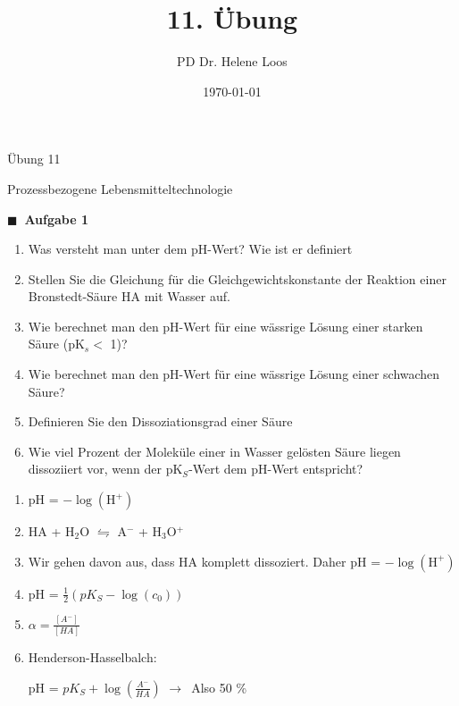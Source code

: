\documentclass[aspectratio=169,9pt]{beamer}
\title{11. Übung}
\author{PD Dr. Helene Loos}
\date{\today}
\newcommand{\RA}{$\rightarrow$~}
\newcommand{\pp}{\par \vspace*{2mm}}
\newcommand{\antwort}[1]{
\begin{tcolorbox}[
	enhanced,
	colframe=unigrau!65,
	sharp corners,
	boxsep=1pt,
	colback=white,
	coltitle=black,
]
	#1
	\end{tcolorbox}
}
\begin{document}
\small



\begin{frame}
\begin{center}

\LARGE Übung 11  \par \normalsize
Prozessbezogene Lebensmitteltechnologie
\end{center}
\small
\end{frame}



\begin{frame}


\begin{minipage}{.5\textwidth}
{\color{miugray}$\blacksquare ~$} \textbf{Aufgabe  1} \par \vspace*{2mm}

\begin{enumerate}[label=\alph*)]
\item<1-> Was versteht man unter dem pH-Wert? Wie ist er definiert
\item<3-> Stellen Sie die Gleichung für die Gleichgewichtskonstante der Reaktion einer Bronstedt-Säure HA mit Wasser auf.
\item<5-> Wie berechnet man den pH-Wert für eine wässrige Lösung einer starken Säure (pK$_s <$ 1)?
\item<7-> Wie berechnet man den pH-Wert für eine wässrige Lösung einer schwachen Säure?
\item<9-> Definieren Sie den Dissoziationsgrad einer Säure
\item<11-> Wie viel Prozent der Moleküle einer in Wasser gelösten Säure liegen dissoziiert vor, wenn der pK$_S$-Wert dem pH-Wert entspricht?
\end{enumerate}


\end{minipage}%
\hspace*{4mm}
\begin{minipage}{.5\textwidth}
\antwort{
\begin{enumerate}[label=\alph*)]
\item<2-> pH = $-\log(\text{H}^+)$ 
\item<4-> HA + H$_2$O $\leftrightharpoons$ A$^-$ + H$_3$O$^+$
\item<6-> Wir gehen davon aus, dass HA komplett dissoziert. Daher pH = $-\log(\text{H}^+)$
\item<8-> pH = $\frac{1}{2} (pK_S - \log(c_0))$
\item<10-> $\alpha = \frac{[A^-]}{[HA]}$
\item<12-> Henderson-Hasselbalch: \pp pH = $pK_S + \log \left(\frac{A^-}{HA} \right)$ \RA Also 50 \%
\end{enumerate}
}

\end{minipage}%
\end{frame}
\end{document}
